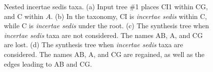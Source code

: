 \documentclass[english]{article}
\begin{document}
\begin{figure}
\hfill{}

\caption{\label{fig:Nested-incertae-sedis}Nested incertae sedis taxa.
(a)
Input tree \#1 places CI1 within CG, and C within $A$.
(b) In the
taxonomy, CI is \emph{incertae sedis }within C, while C is \emph{incertae
sedis} under the root.
(c) The synthesis tree when \emph{incertae
sedis} taxa are not considered.
The names AB, A, and CG are lost.
(d) The synthesis tree when \emph{incertae sedis} taxa are considered.
The names AB, A, and CG are regained, as well as the edges leading
to AB and CG.}

\end{figure}
\end{document}
